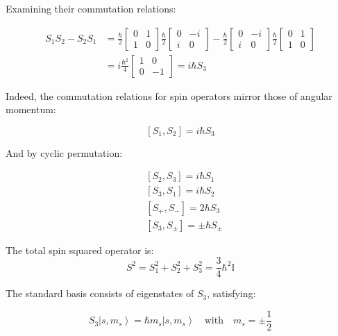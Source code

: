 Examining their commutation relations:

\begin{align}
S_1 S_2 - S_2 S_1 &= \frac{\hbar}{2}\left[\begin{array}{ll}
0 & 1 \\
1 & 0
\end{array}\right] \frac{\hbar}{2}\left[\begin{array}{cc}
0 & -i \\
i & 0
\end{array}\right] - \frac{\hbar}{2}\left[\begin{array}{cc}
0 & -i \\
i & 0
\end{array}\right] \frac{\hbar}{2}\left[\begin{array}{ll}
0 & 1 \\
1 & 0
\end{array}\right] \\
&= i\frac{\hbar^{2}}{4}\left[\begin{array}{cc}
1 & 0 \\
0 & -1
\end{array}\right] = i\hbar S_3
\end{align}


Indeed, the commutation relations for spin operators mirror those of angular momentum:

\begin{equation}
\left[S_{1}, S_{2}\right]=i \hbar S_{3}
\end{equation}

And by cyclic permutation:

\begin{align}
& {\left[S_{2}, S_{3}\right]=i \hbar S_{1}} \\
& {\left[S_{3}, S_{1}\right]=i \hbar S_{2}} \\
& {\left[S_{+}, S_{-}\right]=2 \hbar S_{3}}  \\
& {\left[S_{3}, S_{\pm}\right]=\pm \hbar S_{\pm}}
\end{align}

The total spin squared operator is:
\begin{equation}
S^{2}=S_{1}^{2}+S_{2}^{2}+S_{3}^{2}=\frac{3}{4} \hbar^{2} \mathbb{I}
\end{equation}

The standard basis consists of eigenstates of $S_3$, satisfying:

\begin{equation}
S_{3}\left|s, m_{s}\right\rangle=\hbar m_{s}\left|s, m_{s}\right\rangle \quad \text{with} \quad m_{s}=\pm\frac{1}{2}
\end{equation}


